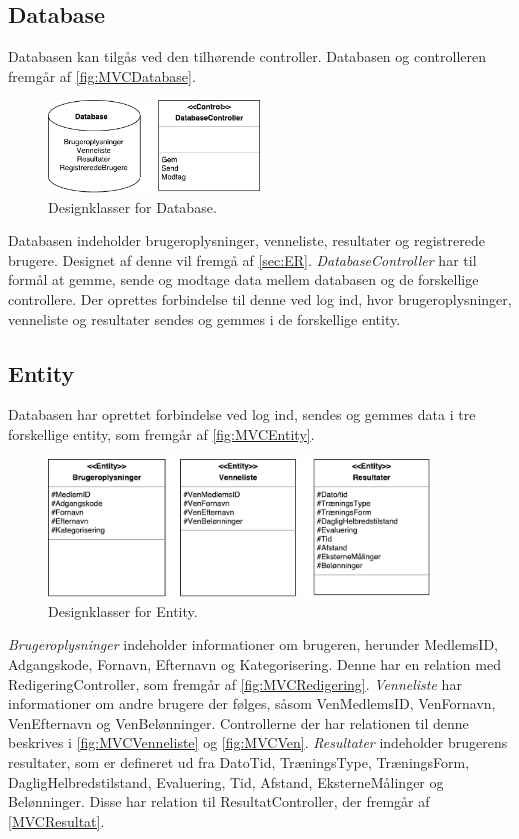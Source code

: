 \subsection{Database}
Databasen kan tilgås ved den tilhørende controller. Databasen og controlleren fremgår af \autoref{fig:MVCDatabase}. 

\begin{figure} [H]
\centering
\includegraphics[width=0.5\textwidth]{figures/MVC/MVCDatabase}
\caption{Designklasser for Database.}
\label{fig:MVCDatabase}
\end{figure}

\noindent
Databasen indeholder brugeroplysninger, venneliste, resultater og registrerede brugere. Designet af denne vil fremgå af \autoref{sec:ER}. \textit{DatabaseController} har til formål at gemme, sende og modtage data mellem databasen og de forskellige controllere. Der oprettes forbindelse til denne ved log ind, hvor brugeroplysninger, venneliste og resultater sendes og gemmes i de forskellige entity. 


\subsection{Entity}  
Databasen har oprettet forbindelse ved log ind, sendes og gemmes data i tre forskellige entity, som fremgår af \autoref{fig:MVCEntity}. 

\begin{figure} [H]
\centering
\includegraphics[width=0.9\textwidth]{figures/MVC/Entity}
\caption{Designklasser for Entity.}
\label{fig:MVCEntity}
\end{figure}

\noindent
\textit{Brugeroplysninger} indeholder informationer om brugeren, herunder MedlemsID, Adgangskode, Fornavn, Efternavn og Kategorisering. Denne har en relation med RedigeringController, som fremgår af \autoref{fig:MVCRedigering}. 
\textit{Venneliste} har informationer om andre brugere der følges, såsom VenMedlemsID, VenFornavn, VenEfternavn og VenBelønninger. Controllerne der har relationen til denne beskrives i \autoref{fig:MVCVenneliste} og  \autoref{fig:MVCVen}.
\textit{Resultater} indeholder brugerens resultater, som er defineret ud fra DatoTid, TræningsType, TræningsForm, DagligHelbredstilstand, Evaluering, Tid, Afstand, EksterneMålinger og Belønninger. Disse har relation til ResultatController, der fremgår af  \autoref{MVCResultat}.

